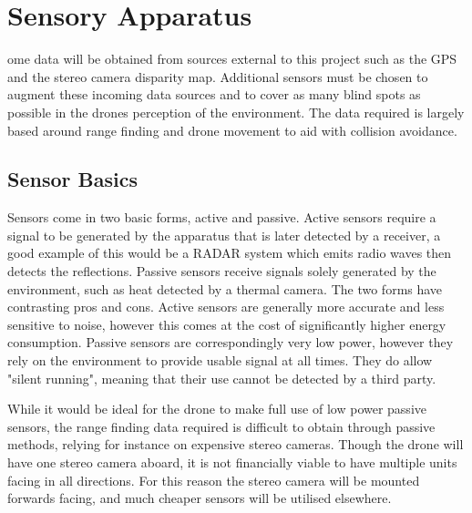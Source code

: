 \let\textcircled=\pgftextcircled
\chapter{Sensory Apparatus}
\label{chap:sensors}

ome data will be obtained from sources external to this project such as the GPS and the stereo camera disparity map. Additional sensors must be chosen to augment these incoming data sources and to cover as many blind spots as possible in the drones perception of the environment. The data required is largely based around range finding and drone movement to aid with collision avoidance. 


\section{Sensor Basics}
\label{sec:sensorbasics}
Sensors come in two basic forms, active and passive. Active sensors require a signal to be generated by the apparatus that is later detected by a receiver, a good example of this would be a RADAR system which emits radio waves then detects the reflections. Passive sensors receive signals solely generated by the environment, such as heat detected by a thermal camera. The two forms have contrasting pros and cons. Active sensors are generally more accurate and less sensitive to noise, however this comes at the cost of significantly higher energy consumption. Passive sensors are correspondingly very low power, however they rely on the environment to provide usable signal at all times. They do allow "silent running", meaning that their use cannot be detected by a third party. \par
	While it would be ideal for the drone to make full use of low power passive sensors, the range finding data required is difficult to obtain through passive methods, relying for instance on expensive stereo cameras. Though the drone will have one stereo camera aboard, it is not financially viable to have multiple units facing in all directions. For this reason the stereo camera will be mounted forwards facing, and much cheaper sensors will be utilised elsewhere.

